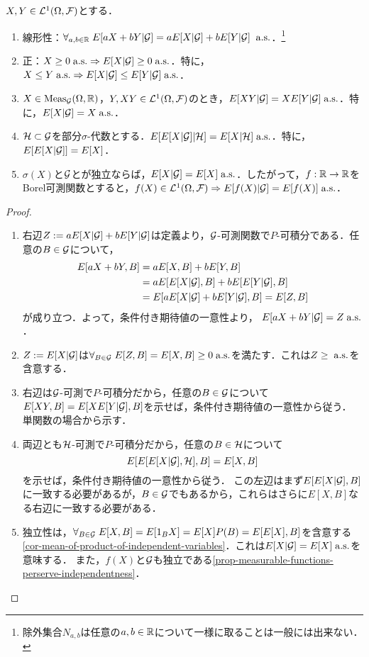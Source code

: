 \documentclass[uplatex,dvipdfmx]{jsreport}
\begin{document}
\begin{lemma}
    $X,Y\in\mathcal{L}^1(\Omega,\mathcal{F})$とする．
    \begin{enumerate}
        \item 線形性：$\forall_{a,b\in\mathbb{R}}\;E[aX+bY|\mathcal{G}]=aE[X|\mathcal{G}]+bE[Y|\mathcal{G}]\;\;\mathrm{a.s.}$．\footnote{除外集合$N_{a,b}$は任意の$a,b\in\mathbb{R}$について一様に取ることは一般には出来ない．}
        \item 正：$X\ge0\;\mathrm{a.s.}\Rightarrow E[X|\mathcal{G}]\ge0\;\mathrm{a.s.}$．特に，$X\le Y\;\mathrm{a.s.}\Rightarrow E[X|\mathcal{G}]\le E[Y|\mathcal{G}]\;\mathrm{a.s.}$．
        \item $X\in\mathrm{Meas}_{\mathcal{G}}(\Omega,\mathbb{R})$，$Y,XY\in\mathcal{L}^1(\Omega,\mathcal{F})$のとき，$E[XY|\mathcal{G}]=XE[Y|\mathcal{G}]\;\mathrm{a.s.}$．特に，$E[X|\mathcal{G}]=X\;\mathrm{a.s.}$．
        \item $\mathcal{H}\subset\mathcal{G}$を部分$\sigma$-代数とする．$E[E[X|\mathcal{G}]|\mathcal{H}]=E[X|\mathcal{H}]\;\mathrm{a.s.}$．特に，$E[E[X|\mathcal{G}]]=E[X]$．
        \item $\sigma(X)$と$\mathcal{G}$とが独立ならば，$E[X|\mathcal{G}]=E[X]\;\mathrm{a.s.}$．したがって，$f:\mathbb{R}\to\mathbb{R}$をBorel可測関数とすると，$f(X)\in\mathcal{L}^1(\Omega,\mathcal{F})\Rightarrow E[f(X)|\mathcal{G}]=E[f(X)]\;\mathrm{a.s.}$．
    \end{enumerate}
\end{lemma}
\begin{proof}\mbox{}
    \begin{enumerate}
        \item 右辺$Z:=aE[X|\mathcal{G}]+bE[Y|\mathcal{G}]$は定義より，$\mathcal{G}$-可測関数で$P$-可積分である．任意の$B\in\mathcal{G}$について，
        \begin{align*}
            E[aX+bY,B]&=aE[X,B]+bE[Y,B]\\
            &=aE[E[X|\mathcal{G}],B]+bE[E[Y|\mathcal{G}],B]\\
            &=E[aE[X|\mathcal{G}]+bE[Y|\mathcal{G}],B]=E[Z,B]
        \end{align*}
        が成り立つ．よって，条件付き期待値の一意性より，
        $E[aX+bY|\mathcal{G}]=Z\;\mathrm{a.s.}$．
        \item $Z:=E[X|\mathcal{G}]$は$\forall_{B\in\mathcal{G}}\;E[Z,B]=E[X,B]\ge0\;\mathrm{a.s.}$を満たす．これは$Z\ge\;\mathrm{a.s.}$を含意する．
        \item 右辺は$\mathcal{G}$-可測で$P$-可積分だから，任意の$B\in\mathcal{G}$について$E[XY,B]=E[XE[Y|\mathcal{G}],B]$を示せば，条件付き期待値の一意性から従う．
        単関数の場合から示す．
        \item 両辺とも$\mathcal{H}$-可測で$P$-可積分だから，任意の$B\in\mathcal{H}$について
        \[E[E[E[X|\mathcal{G}],\mathcal{H}],B]=E[X,B]\]
        を示せば，条件付き期待値の一意性から従う．
        この左辺はまず$E[E[X|\mathcal{G}],B]$に一致する必要があるが，$B\in\mathcal{G}$でもあるから，これらはさらに$E[X,B]$なる右辺に一致する必要がある．
        \item 独立性は，$\forall_{B\in\mathcal{G}}\;E[X,B]=E[1_BX]=E[X]P(B)=E[E[X],B]$を含意する\ref{cor-mean-of-product-of-independent-variables}．これは$E[X|\mathcal{G}]=E[X]\;\mathrm{a.s.}$を意味する．
        また，$f(X)$と$\mathcal{G}$も独立である\ref{prop-measurable-functions-perserve-independentness}．
    \end{enumerate}
\end{proof}
\end{document}
